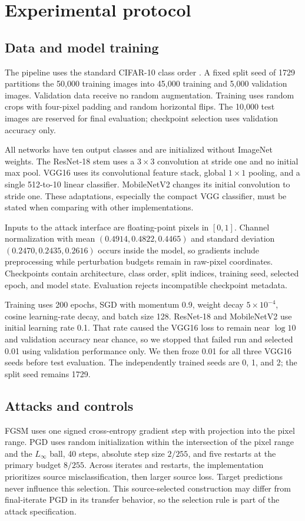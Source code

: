 \documentclass[10pt]{article}
\begin{document}
\section{Experimental protocol}
\subsection{Data and model training}
The pipeline uses the standard CIFAR-10 class order \citep{cifar}. A fixed split seed of 1729 partitions the 50,000 training images into 45,000 training and 5,000 validation images. Validation data receive no random augmentation. Training uses random crops with four-pixel padding and random horizontal flips. The 10,000 test images are reserved for final evaluation; checkpoint selection uses validation accuracy only.

All networks have ten output classes and are initialized without ImageNet weights. The ResNet-18 stem uses a $3\times3$ convolution at stride one and no initial max pool. VGG16 uses its convolutional feature stack, global $1\times1$ pooling, and a single 512-to-10 linear classifier. MobileNetV2 changes its initial convolution to stride one. These adaptations, especially the compact VGG classifier, must be stated when comparing with other implementations.

Inputs to the attack interface are floating-point pixels in $[0,1]$. Channel normalization with mean $(0.4914,0.4822,0.4465)$ and standard deviation $(0.2470,0.2435,0.2616)$ occurs inside the model, so gradients include preprocessing while perturbation budgets remain in raw-pixel coordinates. Checkpoints contain architecture, class order, split indices, training seed, selected epoch, and model state. Evaluation rejects incompatible checkpoint metadata.

Training uses 200 epochs, SGD with momentum 0.9, weight decay $5\times10^{-4}$, cosine learning-rate decay, and batch size 128. ResNet-18 and MobileNetV2 use initial learning rate 0.1. That rate caused the VGG16 loss to remain near $\log 10$ and validation accuracy near chance, so we stopped that failed run and selected 0.01 using validation performance only. We then froze 0.01 for all three VGG16 seeds before test evaluation. The independently trained seeds are 0, 1, and 2; the split seed remains 1729.

\subsection{Attacks and controls}
FGSM uses one signed cross-entropy gradient step with projection into the pixel range. PGD uses random initialization within the intersection of the pixel range and the $L_\infty$ ball, 40 steps, absolute step size $2/255$, and five restarts at the primary budget $8/255$. Across iterates and restarts, the implementation prioritizes source misclassification, then larger source loss. Target predictions never influence this selection. This source-selected construction may differ from final-iterate PGD in its transfer behavior, so the selection rule is part of the attack specification.
\end{document}
